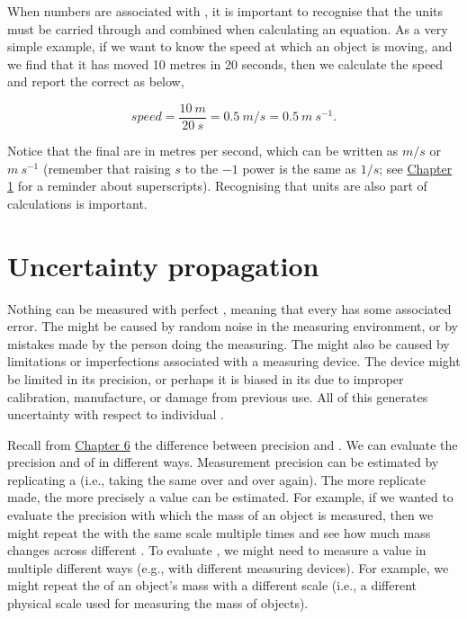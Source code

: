 \documentclass[
  openany]{krantz}
\begin{document}
When numbers are associated with , it is important to recognise that the units must be carried through and combined when calculating an equation.
As a very simple example, if we want to know the speed at which an object is moving, and we find that it has moved 10 metres in 20 seconds, then we calculate the speed and report the correct  as below,

\[speed = \frac{10\:m}{20\:s} = 0.5\:m/s = 0.5\:m\:s^{-1}.\]

Notice that the final  are in metres per second, which can be written as \(m/s\) or \(m\:s^{-1}\) (remember that raising \(s\) to the \(-1\) power is the same as \(1/s\); see \protect\hyperlink{Chapter_1}{Chapter 1} for a reminder about superscripts).
Recognising that units are also part of calculations is important.

\hypertarget{Chapter_7}{%
\chapter{Uncertainty propagation}\label{Chapter_7}}

Nothing can be measured with perfect , meaning that every  has some associated error.
The  might be caused by random noise in the measuring environment, or by mistakes made by the person doing the measuring.
The  might also be caused by limitations or imperfections associated with a measuring device.
The device might be limited in its  precision, or perhaps it is biased in its  due to improper calibration, manufacture, or damage from previous use.
All of this generates uncertainty with respect to individual .

Recall from \protect\hyperlink{Chapter_6}{Chapter 6} the difference between precision and .
We can evaluate the precision and  of  in different ways.
Measurement precision can be estimated by replicating a  (i.e., taking the same  over and over again).
The more replicate  made, the more precisely a value can be estimated.
For example, if we wanted to evaluate the precision with which the mass of an object is measured, then we might repeat the  with the same scale multiple times and see how much mass changes across different .
To evaluate  , we might need to measure a value in multiple different ways (e.g., with different measuring devices).
For example, we might repeat the  of an object's mass with a different scale (i.e., a different physical scale used for measuring the mass of objects).
\end{document}
